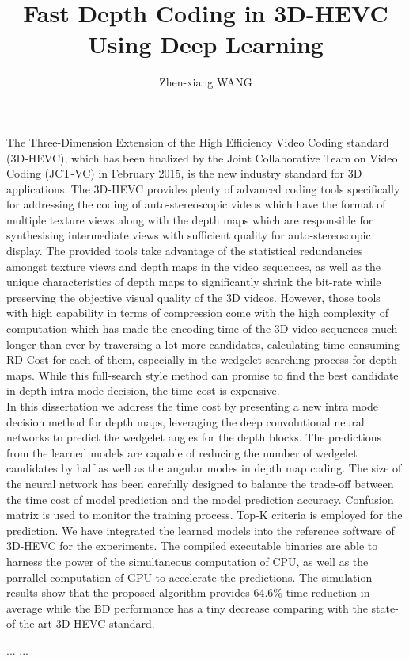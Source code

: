 \documentclass{report}
\begin{document}
    \title{Fast Depth Coding in 3D-HEVC\\
    Using Deep Learning}
    \author{Zhen-xiang WANG}
    \beforepreface
    The Three-Dimension Extension of the High Efficiency Video Coding standard (3D-HEVC),
    which has been finalized by the Joint Collaborative Team on Video Coding
    (JCT-VC) in February 2015, is the new industry standard for 3D applications.
    The 3D-HEVC provides plenty of advanced coding tools specifically
    for addressing the coding of auto-stereoscopic videos which have the format
    of multiple texture views along with the depth maps which are responsible
    for synthesising intermediate views with sufficient quality for
    auto-stereoscopic display.
    The provided tools take advantage of the statistical redundancies amongst
    texture views and depth maps in the video sequences, as well as the unique
    characteristics of depth maps to significantly shrink the bit-rate
    while preserving the objective visual quality of the
    3D videos.
    However, those tools with high capability in terms of compression come
    with the high complexity of computation which has made the encoding time
    of the 3D video sequences much longer than ever by traversing a lot more
    candidates, calculating time-consuming RD Cost for each of them,
    especially in the wedgelet searching process for depth maps.
    While this full-search style method can promise to find the best
    candidate in depth intra mode decision, the time cost is expensive.\\
    \newline
    In this dissertation we address the time cost by presenting a new
    intra mode decision method for depth maps, leveraging the deep
    convolutional neural networks to predict the wedgelet angles
    for the depth blocks.
    The predictions from the learned models are capable of
    reducing the number of wedgelet candidates by half as well as the
    angular modes in depth map coding.
    The size of the neural network has been carefully designed to balance
    the trade-off between the time cost of model prediction and the model prediction
    accuracy.
    Confusion matrix is used to monitor the training process.
    Top-K criteria is employed for the prediction.
    We have integrated the learned models into the reference software of
    3D-HEVC for the experiments.
    The compiled executable binaries are able to harness
    the power of the simultaneous computation of CPU, as well as
    the parrallel computation of GPU to accelerate the predictions.
    The simulation results show that the proposed algorithm
    provides 64.6\% time reduction in average while the
    BD performance has a tiny decrease comparing with the state-of-the-art 3D-HEVC
    standard.


    \afterpreface

    
    
    ...
    ...
    \printbibliography[heading=bibintoc]
\end{document}

